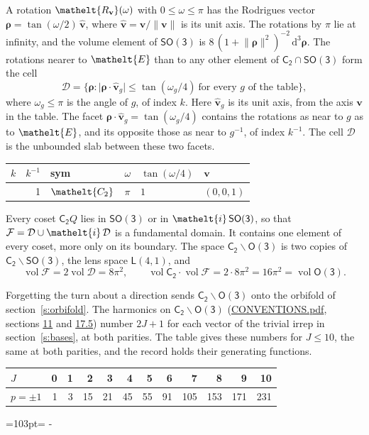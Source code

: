 \documentclass[10pt,a4paper]{article}
\newcommand{\needspace}[1]{\par\penalty-100\begingroup\dimen0=#1\relax\dimen2=\pagegoal
  \advance\dimen2-\pagetotal\ifdim\dimen0>\dimen2\relax\ifdim\dimen2>0pt\vfil\break\fi\fi
  \endgroup}
\numberwithin{equation}{section}
\newcommand{\eltfont}[1]{{\let\sigma\eltsigma\mathelt{#1}}}
\newcommand{\grp}[1]{\mathsf{#1}}
\newcommand{\cls}[1]{\eltfont{#1}}
\newcommand{\elt}[1]{\eltfont{#1}}
\newcommand{\dirvec}[3]{(#1, #2, #3)}
\newcommand{\unitaxis}{\hat{\mathbf{v}}}
\newcommand{\vv}{\mathbf{v}}
\newcommand{\diff}{\mathrm{d}}
\newcommand{\vol}{\operatorname{vol}}
\newcommand{\rodrigues}{\boldsymbol{\rho}}
\newcommand{\fcell}{\mathcal{D}}
\newcommand{\fdomain}{\mathcal{F}}
\newcommand{\lensspace}[2]{\mathsf{L}(#1, #2)}
\begin{document}
\leavevmode\label{n:vector.rodrigues}\label{n:vector.unitaxis}A rotation $\elt{R_{\vv}}(\omega)$ with $0 \le \omega \le \pi$ has the Rodrigues vector $\rodrigues = \tan(\omega/2)\,\unitaxis$, where $\unitaxis = \vv/\lVert\vv\rVert$ is its unit axis. The rotations by $\pi$ lie at infinity, and the volume element of \href{SO3.pdf}{$\grp{SO(3)}$} is $8\,(1 + \lVert\rodrigues\rVert^2)^{-2}\,\diff^3\rodrigues$.
\leavevmode\label{n:set.cell}The rotations nearer to $\elt{E}$ than to any other element of $\grp{C_{2}} \cap \grp{SO(3)}$ form the cell
\begin{equation}\label{e:cell}\fcell = \bigl\{\rodrigues : \lvert\rodrigues\cdot\unitaxis_g\rvert \le \tan(\omega_g/4)\ \text{for every $g$ of the table}\bigr\},\end{equation}
where $\omega_g \le \pi$ is the angle of $g$, of index $k$. Here $\unitaxis_g$ is its unit axis, from the axis $\vv$ in the table. The facet $\rodrigues\cdot\unitaxis_g = \tan(\omega_g/4)$ contains the rotations as near to $g$ as to $\elt{E}$, and its opposite those as near to $g^{-1}$, of index $k^{-1}$. The cell $\fcell$ is the unbounded slab between these two facets.
{\small\begin{longtable}{@{}rrllll@{}}\toprule
$k$ & $k^{-1}$ & sym & $\omega$ & $\tan(\omega/4)$ & $\vv$\\\midrule\endhead
\bottomrule\endfoot\endlastfoot
1 & 1 & $\cls{C_{2}}$ & $\pi$ & $1$ & $\dirvec{0}{0}{1}$\\
\bottomrule\end{longtable}}

\leavevmode\label{n:set.fundamental}Every coset $\grp{C_{2}}Q$ lies in \href{SO3.pdf}{$\grp{SO(3)}$} or in $\elt{i}\,\grp{SO(3)}$, so that $\fdomain = \fcell \cup \elt{i}\,\fcell$ is a fundamental domain. It contains one element of every coset, more only on its boundary.
\leavevmode\label{n:set.lens}The space $\grp{C_{2}}\backslash\grp{O(3)}$ is two copies of $\grp{C_{2}}\backslash\grp{SO(3)}$, the lens space $\lensspace{4}{1}$, and
\begin{equation}\label{e:volume}\vol\fdomain = 2\vol\fcell = 8\pi^2,\qquad \vol\grp{C_{2}}\cdot\vol\fdomain = 2\cdot 8\pi^2 = 16\pi^2 = \vol\grp{O(3)}.\end{equation}

Forgetting the turn about a direction sends $\grp{C_{2}}\backslash\grp{O(3)}$ onto the orbifold of section~\ref{s:orbifold}.
The harmonics on $\grp{C_{2}}\backslash\grp{O(3)}$ (\href{../../CONVENTIONS.pdf}{CONVENTIONS.pdf}, sections \href{../../CONVENTIONS.pdf\#conv.11}{11} and \href{../../CONVENTIONS.pdf\#conv.17.5}{17.5}) number $2J + 1$ for each vector of the trivial irrep in section~\ref{s:bases}, at both parities. The table gives these numbers for $J \le 10$, the same at both parities, and the record holds their generating functions.
{\small\setlength{\tabcolsep}{4pt}\begin{longtable}{@{}lrrrrrrrrrrr@{}}\toprule
$J$ & 0 & 1 & 2 & 3 & 4 & 5 & 6 & 7 & 8 & 9 & 10\\\midrule\endhead
\bottomrule\endfoot\endlastfoot
$p = \pm 1$ & 1 & 3 & 15 & 21 & 45 & 55 & 91 & 105 & 153 & 171 & 231\\
\bottomrule\end{longtable}}
\needspace{103pt}
\end{document}
